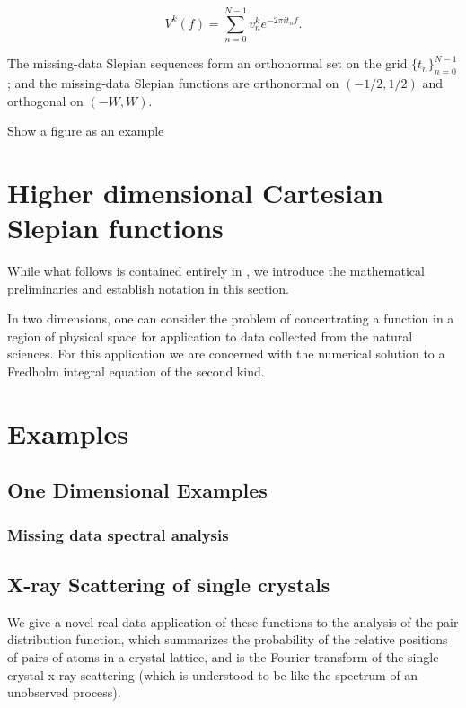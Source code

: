 \documentclass[preprint,12pt]{elsarticle}
\begin{document}
\begin{equation} V^{k}(f) = \sum_{n = 0}^{N-1} v^{k}_{n} e^{-2 \pi i t_n f}. \end{equation}

The missing-data Slepian sequences form an orthonormal set on the grid
$\{t_n\}_{n=0}^{N-1}$; and the missing-data Slepian functions are orthonormal on
$(-1/2,1/2)$ and orthogonal on $(-W,W)$. 

Show a figure as an example

\section{Higher dimensional Cartesian Slepian functions}

While what follows is contained entirely in \cite{simons2011}, we introduce the mathematical 
preliminaries and establish notation in this section. 

In two dimensions, one can consider the problem of concentrating a function in a region of physical space
for application to data collected from the natural sciences. For this application we are concerned with the 
numerical solution to a Fredholm integral equation of the second kind. 

\section{Examples}

\subsection{One Dimensional Examples}

\subsubsection{Missing data spectral analysis}


\subsection{X-ray Scattering of single crystals}

We give a novel real data application of these functions to the analysis of the 
pair distribution function, which summarizes the probability of the relative positions of pairs of atoms in a crystal lattice, and is the Fourier transform of the single crystal x-ray scattering (which is understood to be like the spectrum of an unobserved process).
\end{document}
